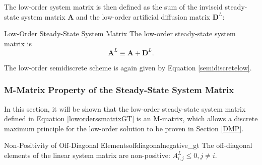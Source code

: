 The low-order system matrix is then defined as the sum of the inviscid
steady-state system matrix $\mathbf{A}$ and the low-order artificial diffusion
matrix $\mathbf{D}^L$:
\begin{definition}{Low-Order Steady-State System Matrix}{}
   The low-order steady-state system matrix is
   \begin{equation}\label{loworderssmatrixGT}
      \mathbf{A}^L \equiv \mathbf{A} + \mathbf{D}^L.
   \end{equation}
\end{definition}
The low-order semidiscrete scheme is again given by Equation \eqref{semidiscretelow}.
\subsubsection{M-Matrix Property of the Steady-State System Matrix}
In this section, it will be shown that the low-order steady-state
system matrix defined in Equation \eqref{loworderssmatrixGT} is an M-matrix, which
allows a discrete maximum principle for the low-order solution to be proven in
Section \ref{DMP}.
\begin{lemma}{Non-Positivity of Off-Diagonal Elements}{offdiagonalnegative_gt}
   The off-diagonal elements of the linear system matrix are non-positive:
   $A^L_{i,j}\le 0, j\ne i$.
\end{lemma}

